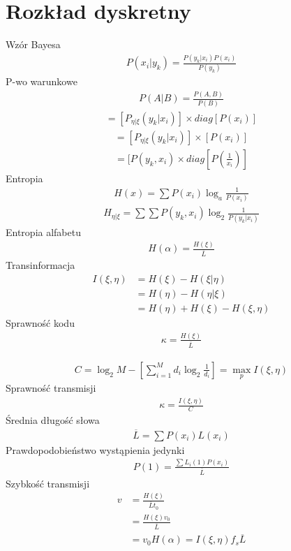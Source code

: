 \documentclass[10pt,twocolumn,a4paper,fleqn]{article}
\begin{document}
\author{Jakub Król}
\date{Semestr zimowy 2011}
\section{Rozkład dyskretny} 
Wzór Bayesa
\begin{align*}
	P(x_i|y_k) = \frac{P(y_k|x_i) P(x_i)}{P(y_k)}
\end{align*}
P-wo warunkowe
\begin{align*}
	P(A|B) = \frac{P(A,B)}{P(B)}
\end{align*}
\begin{align*}
[P(y_k,x_i)] =	[P_{\eta|\xi}(y_k|x_i)]\times diag[P(x_i)]
\end{align*}
\begin{align*}
[P(y_k)] =	[P_{\eta|\xi}(y_k|x_i)]\times [P(x_i)]
\end{align*}
\begin{align*}
	[P(y_k|x_i)] = [P(y_k,x_i) \times diag[P(\frac{1}{x_i})]
\end{align*}
Entropia
\begin{align*}
	H(x) = \sum P(x_i) \log_a{\frac{1}{P(x_i)}}
\end{align*}
\begin{align*}
	H_{\eta|\xi} = \sum \sum P(y_k,x_i) \log_2\frac{1}{P(y_k|x_i)}
\end{align*}
Entropia alfabetu
\begin{align*}
	H(\alpha) = \frac{H(\xi)}{\overline{L}}
\end{align*}
Transinformacja
\begin{align*}
	I(\xi,\eta) & = H(\xi)-H(\xi|\eta) \\
				& =H(\eta)-H(\eta|\xi)\\
				& = H(\eta)+H(\xi)-H(\xi,\eta)
\end{align*}
Sprawność kodu
\begin{align*}
	\kappa = \frac{H(\xi)}{\overline{L}}
\end{align*}

\begin{align*}
	C = \log_2{M} - \left[\sum_{i=1}^M d_i\log_2{\frac{1}{d_i}} \right] = \max_{p} I(\xi,\eta)
\end{align*}
Sprawność transmisji
\begin{align*}
	\kappa = \frac{I(\xi,\eta)}{C}
\end{align*}
Średnia długość słowa
\begin{align*}
	\overline{L} = \sum P(x_i)L(x_i)
\end{align*}
Prawdopodobieństwo wystąpienia jedynki
\begin{align*}
	P(1) = \frac{\sum L_i(1)P(x_i)}{\overline{L}}
\end{align*}
Szybkość transmisji
\begin{align*}
	v 	& = \frac{H(\xi)}{\overline{L}t_0}\\
   		& = \frac{H(\xi)v_0}{\overline{L}}\\
	 	& = v_0H(\alpha)=I(\xi,\eta)f_s \overline{L}
\end{align*}
\end{document}
